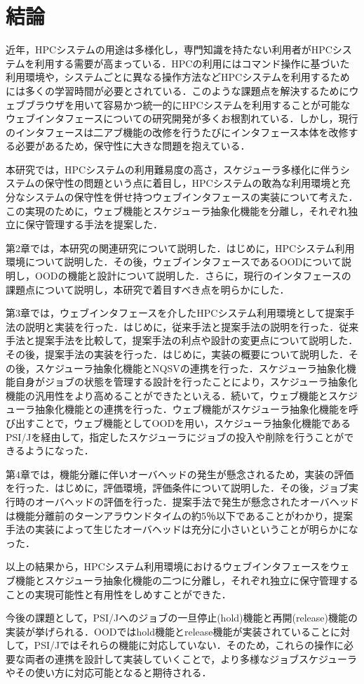 \section{結論}
近年，HPCシステムの用途は多様化し，専門知識を持たない利用者がHPCシステムを利用する需要が高まっている．HPCの利用にはコマンド操作に基づいた利用環境や，システムごとに異なる操作方法などHPCシステムを利用するためには多くの学習時間が必要とされている．このような課題点を解決するためにウェブブラウザを用いて容易かつ統一的にHPCシステムを利用することが可能なウェブインタフェースについての研究開発が多くお根割れている．しかし，現行のインタフェースは二アブ機能の改修を行うたびにインタフェース本体を改修する必要があるため，保守性に大きな問題を抱えている．\par
本研究では，HPCシステムの利用難易度の高さ，スケジューラ多様化に伴うシステムの保守性の問題という点に着目し，HPCシステムの敢為な利用環境と充分なシステムの保守性を併せ持つウェブインタフェースの実装について考えた．この実現のために，ウェブ機能とスケジューラ抽象化機能を分離し，それぞれ独立に保守管理する手法を提案した．\par
第2章では，本研究の関連研究について説明した．はじめに，HPCシステム利用環境について説明した．その後，ウェブインタフェースであるOODについて説明し，OODの機能と設計について説明した．さらに，現行のインタフェースの課題点について説明し，本研究で着目すべき点を明らかにした．\par
第3章では，ウェブインタフェースを介したHPCシステム利用環境として提案手法の説明と実装を行った．はじめに，従来手法と提案手法の説明を行った．従来手法と提案手法を比較して，提案手法の利点や設計の変更点について説明した．その後，提案手法の実装を行った．はじめに，実装の概要について説明した．その後，スケジューラ抽象化機能とNQSVの連携を行った．スケジューラ抽象化機能自身がジョブの状態を管理する設計を行ったことにより，スケジューラ抽象化機能の汎用性をより高めることができたといえる．続いて，ウェブ機能とスケジューラ抽象化機能との連携を行った．ウェブ機能がスケジューラ抽象化機能を呼び出すことで，ウェブ機能としてOODを用い，スケジューラ抽象化機能であるPSI/Jを経由して，指定したスケジューラにジョブの投入や削除を行うことができるようになった．\par
第4章では，機能分離に伴いオーバヘッドの発生が懸念されるため，実装の評価を行った．はじめに，評価環境，評価条件について説明した．その後，ジョブ実行時のオーバヘッドの評価を行った．提案手法で発生が懸念されたオーバヘッドは機能分離前のターンアラウンドタイムの約5％以下であることがわかり，提案手法の実装によって生じたオーバヘッドは充分に小さいということが明らかになった．\par
以上の結果から，HPCシステム利用環境におけるウェブインタフェースをウェブ機能とスケジューラ抽象化機能の二つに分離し，それぞれ独立に保守管理することの実現可能性と有用性をしめすことができた．\par
今後の課題として，PSI/Jへのジョブの一旦停止(hold)機能と再開(release)機能の実装が挙げられる．OODではhold機能とrelease機能が実装されていることに対して，PSI/Jではそれらの機能に対応していない．そのため，これらの操作に必要な両者の連携を設計して実装していくことで，より多様なジョブスケジューラやその使い方に対応可能となると期待される．

